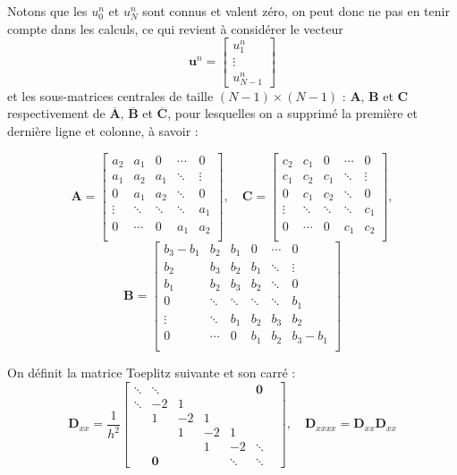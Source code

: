 \documentclass[a4,12pt]{article}
\newcommand{\A}{\mathbf{A}}
\newcommand{\B}{\mathbf{B}}
\newcommand{\C}{\mathbf{C}}
\newcommand{\D}{\mathbf{D}}
\newcommand{\ub}{\mathbf{u}}
\begin{document}
Notons que les $u_0^n$ et $u_{N}^n$ sont connus et valent zéro, on peut donc ne pas en tenir compte dans les calculs, ce qui revient à considérer le vecteur 
\[
\ub^n=\begin{bmatrix}u_1^n\\ \vdots \\ u_{N-1}^n\end{bmatrix}
\]
et les sous-matrices centrales de taille $(N-1)\times (N-1)$ : $\A$, $\B$ et $\C$ respectivement de $\overline{\A}$, $\overline{\B}$ et $\overline{\C}$, pour lesquelles on a supprimé la première et dernière ligne et colonne, à savoir :

\[
\A=
\begin{bmatrix} 
a_2 & a_1 & 0 & \cdots & 0 \\ 
a_1 & a_2 & a_1 & \ddots & \vdots \\ 
0 & a_1 & a_2 & \ddots  & 0 \\ 
\vdots & \ddots & \ddots & \ddots  & a_1 \\ 
0 & \cdots & 0 & a_1 & a_2  \\
\end{bmatrix},\quad 
\C=
\begin{bmatrix} 
c_2 & c_1 & 0 & \cdots & 0 \\ 
c_1 & c_2 & c_1 & \ddots & \vdots \\ 
0 & c_1 & c_2 & \ddots  & 0 \\ 
\vdots & \ddots & \ddots & \ddots  & c_1 \\ 
0 & \cdots & 0 & c_1 & c_2  \\
\end{bmatrix},
\]
\[
\B=
\begin{bmatrix}
b_3-b_1 & b_2 & b_1 & 0 & \cdots & 0  \\ 
b_2 & b_3 & b_2 & b_1 & \ddots & \vdots \\  
b_1 & b_2 & b_3 & b_2 & \ddots & 0 \\ 
0 & \ddots & \ddots & \ddots & \ddots &b_1\\ 
\vdots & \ddots & b_1 & b_2 & b_3 & b_2  \\ 
0 & \cdots &  0 & b_1 & b_2 & b_3-b_1  \\
\end{bmatrix}
\]

On définit la matrice Toeplitz suivante et son carré : 
\[
\D_{xx}=\frac{1}{h^2}
\begin{bmatrix}
\ddots & \ddots & & & & \mathbf{0}  & \\
\ddots & -2 & 1 & & & & \\ 
& 1 & -2 & 1 & & & \\ 
& & 1 & -2 & 1 & & \\ 
& & & 1 & -2 & \ddots \\ 
& \mathbf{0} & & & \ddots & \ddots
\end{bmatrix}, 
\quad \D_{xxxx}=\D_{xx}\D_{xx}
\]
\end{document}
